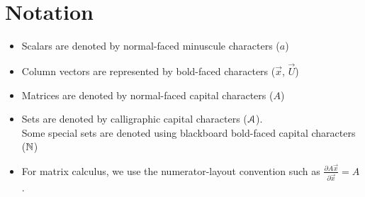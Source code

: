 
\chapter*{Notation}
\adjustmtc
\begin{itemize}
  \item Scalars are denoted by normal-faced minuscule characters ($a$)
  \item Column vectors are represented by bold-faced characters ($\vec{x}$, $\vec{U}$)
  \item Matrices are denoted by normal-faced capital characters ($A$)
  \item Sets are denoted by calligraphic capital characters ($\mathcal{A}$).
        \\Some special sets are denoted using blackboard bold-faced capital characters ($\mathbb{N}$)
  \item For matrix calculus, we use the numerator-layout convention such as $\frac{\partial A\vec{x}}{\partial\vec{x}}=A$.
\end{itemize}

